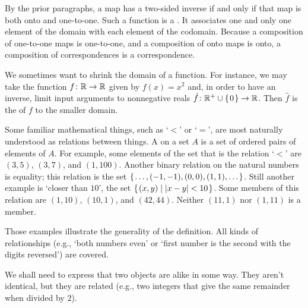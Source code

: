 By the prior paragraphs, a map has a two-sided inverse 
if and only if that map is both onto and one-to-one. 
Such a function is a 
.
It associates one and only one element of the domain with each element of the
codomain.
Because a composition of one-to-one maps is one-to-one, and a composition
of onto maps is onto, a composition of correspondences is a
correspondence.

We sometimes want to shrink the domain of a function.
For instance, we may take the function \( \mbox{$f\colon \mathbb{R}\to \mathbb{R}$} \) given by
\( f(x)=x^2 \) and, in order to have an inverse, limit input arguments to
nonnegative reals \( \mbox{$\hat{f}\colon \mathbb{R}^+\cup\mbox{$\{\hspace{0.1em}0\hspace{0.1em}\}$}\to \mathbb{R}$} \).
Then \( \hat{f} \) is 
the  of
\( f \) to the smaller domain.








Some familiar mathematical things, such as `\( < \)' or `\( = \)',
are most naturally understood as relations between things.
A  on a set \( A \) is
a set of ordered pairs of elements of \( A \).
For example, some elements of the set that is the
relation `$<$' are
\( (3,5) \), \( (3,7) \), and \( (1,100) \).
Another binary relation on the natural numbers is equality; this relation is
the set
\( \mbox{$\{\hspace{0.1em}\ldots,(-1,-1),(0,0),(1,1),\ldots\hspace{0.1em}\}$} \).
Still another example is `closer than \( 10 \)', the set
\( \mbox{$\{\hspace{0.1em}(x,y)\mid |x-y|<10 \hspace{0.1em}\}$} \).
Some members of this relation are \( (1,10) \), \( (10,1) \),
and \( (42,44) \).
Neither \( (11,1) \) nor \( (1,11) \) is a member.

Those examples illustrate the generality of the definition.
All kinds of relationships (e.g., `both numbers
even' or `first number is the second with the digits reversed')
are covered.




We shall need to express that two objects are alike in some way.
They aren't identical, but they are related
(e.g., two integers that give the same remainder when divided by \( 2 \)).

